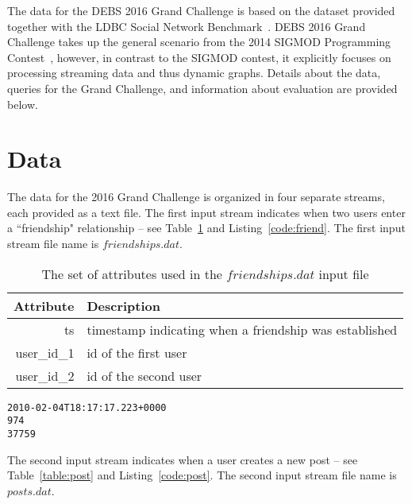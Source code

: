 \documentclass{sig-alternate}
\begin{document}
The data for the DEBS 2016 Grand Challenge is based on the dataset provided together with the LDBC Social Network Benchmark~\cite{erling2015social}. DEBS 2016 Grand Challenge takes up the general scenario from the 2014 SIGMOD Programming Contest~\cite{DBLP:conf/sigmod/2014}, however, in contrast to the SIGMOD contest, it explicitly focuses on processing streaming data and thus dynamic graphs. Details about the data, queries for the Grand Challenge, and information about evaluation are provided below.

\section{Data}
\label{sec:data}
The data for the 2016 Grand Challenge is organized in four separate streams, each provided as a text file. The first input stream indicates when two users enter a ``friendship" relationship -- see Table~\ref{table:friend} and Listing~\ref{code:friend}. The first input stream file name is $friendships.dat$.


\begin{table}[ht]
	\caption{The set of attributes used in the $friendships.dat$ input file}
	\centering 
	\begin{tabular}{r p{5.2cm}}
		\toprule
		Attribute		&	 Description\\
		\midrule
		ts			&	timestamp indicating when a friendship was established\\[2ex]
		user\_id\_1	&	id of the first user\\[2ex]
		user\_id\_2	&	id of the second user\\[2ex]		
		\bottomrule 
	\end{tabular}
	\label{table:friend}
\end{table}



\lstset{}
\begin{lstlisting}[float=ht,caption={First line from the $friendships.dat$ file -- one attribute per line of listing},label={code:friend}]
2010-02-04T18:17:17.223+0000
974
37759
\end{lstlisting}	

The second input stream indicates when a user creates a new post -- see Table~\ref{table:post} and Listing~\ref{code:post}. The second input stream file name is $posts.dat$.
\end{document}
